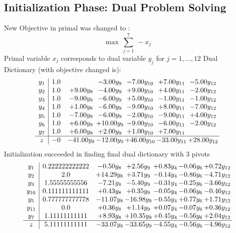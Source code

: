 \documentclass[8pt]{article}
\begin{document}
\subsection{Initialization Phase: Dual Problem Solving}
New Objective in primal was changed to : \[ \max\ \sum_{j=1}^{7}\ - x_j \] 
Primal variable $x_j$ corresponds to dual variable $y_j$ for $j = 1,\ldots,12$
Dual Dictionary (with objective changed is): 
\[\begin{array}{c| c c@{\hskip 2pt} c@{\hskip 2pt} c@{\hskip 2pt} c@{\hskip 2pt} c@{\hskip 2pt} }
 y_{1}   &  1.0  &   & -3.00 y_{9} & -7.00 y_{10} & +  7.00 y_{11} & -5.00 y_{12}\\
 y_{2}   &  1.0 & +  9.00 y_{8} & -4.00 y_{9} & +  9.00 y_{10} & +  4.00 y_{11} & -2.00 y_{12}\\
 y_{3}   &  1.0 & -9.00 y_{8} & -6.00 y_{9} & +  5.00 y_{10} & -1.00 y_{11} & -1.00 y_{12}\\
 y_{4}   &  1.0 & +  1.00 y_{8} & -6.00 y_{9} & -9.00 y_{10} & +  8.00 y_{11} & -7.00 y_{12}\\
 y_{5}   &  1.0 & -7.00 y_{8} & -6.00 y_{9} & -2.00 y_{10} & -9.00 y_{11} & +  4.00 y_{12}\\
 y_{6}   &  1.0 & +  6.00 y_{8} & + 10.00 y_{9} & -9.00 y_{10} & -6.00 y_{11} & -2.00 y_{12}\\
 y_{7}   &  1.0 & +  6.00 y_{8} & +  2.00 y_{9} & +  1.00 y_{10} & +  7.00 y_{11} &   \\
\hline
z    &  -0 & -41.00 y_{8} & -12.00 y_{9} & + 46.00 y_{10} & -33.00 y_{11} & + 28.00 y_{12}\\
\end{array}\]
Initialization succeeded in finding final dual dictionary with 3 pivots
\[\begin{array}{c| c c@{\hskip 2pt} c@{\hskip 2pt} c@{\hskip 2pt} c@{\hskip 2pt} c@{\hskip 2pt} }
 y_{1}   &  0.222222222222 & -0.50 y_{8} & +  2.56 y_{9} & +  0.83 y_{4} & -0.06 y_{6} & +  0.72 y_{12}\\
 y_{2}   &  2.0 & + 14.29 y_{8} & +  3.71 y_{9} & -0.14 y_{4} & -0.86 y_{6} & -4.71 y_{12}\\
 y_{3}   &  1.55555555556 & -7.21 y_{8} & -5.40 y_{9} & -0.31 y_{4} & -0.25 y_{6} & -3.66 y_{12}\\
 y_{10}   &  0.111111111111 & +  0.43 y_{8} & +  0.35 y_{9} & -0.05 y_{4} & -0.06 y_{6} & -0.46 y_{12}\\
 y_{5}   &  0.777777777778 & -11.07 y_{8} & -16.98 y_{9} & -0.55 y_{4} & +  0.77 y_{6} & +  1.71 y_{12}\\
 y_{11}   &  0.0 & +  0.36 y_{8} & +  1.14 y_{9} & +  0.07 y_{4} & -0.07 y_{6} & +  0.36 y_{12}\\
 y_{7}   &  1.11111111111 & +  8.93 y_{8} & + 10.35 y_{9} & +  0.45 y_{4} & -0.56 y_{6} & +  2.04 y_{12}\\
\hline
z    &  5.11111111111 & -33.07 y_{8} & -33.65 y_{9} & -4.55 y_{4} & -0.56 y_{6} & -4.96 y_{12}\\
\end{array}\]
\end{document}
